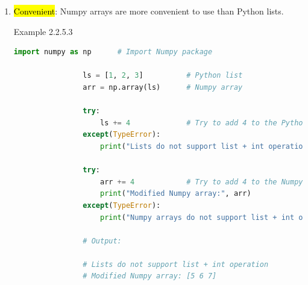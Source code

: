 \documentclass{book}
\begin{document}
\begin{enumerate}
\begin{egBox}{Example 2.2.5.2}{}
\begin{lstlisting}[language=Python, basicstyle=\ttfamily\small, keywordstyle=\color{blue}, commentstyle=\color{forestgreen}, stringstyle=\color{red}, showstringspaces=false]
size = 1000000  # Size of the arrays and lists

list1 = range(size) # Declare lists
list2 = range(size)
array1 = np.arange(size) # Declare Numpy arrays
array2 = np.arange(size)

# Capture time before the multiplication of Python lists
initial_time = T.time()
# Multiply elements of both the lists and stored in another list
result_list = [(a * b) for a, b in zip(list1, list2)]
# Calculate execution time, it prints "Time taken by Lists: 0.13024258613586426 s"
print("Time taken by Lists:", T.time() - initial_time, "s")

# Capture time before the multiplication of Numpy arrays
initial_time = T.time()
# Multiply elements of both the Numpy arrays and stored in another Numpy array
result_array = array1 * array2
# Calculate execution time, it prints "Time taken by Numpy Arrays: 0.006006956100463867 s"
print("Time taken by Numpy Arrays:", T.time() - initial_time, "s")
    \end{lstlisting}
\end{egBox}
\newpage
\item \hl{Convenient}: Numpy arrays are more convenient to use than Python lists.
    \begin{egBox}{Example 2.2.5.3}{}
        \begin{lstlisting}[language=Python, basicstyle=\ttfamily\small, keywordstyle=\color{blue}, commentstyle=\color{forestgreen}, stringstyle=\color{red},
        showstringspaces=false]
                import numpy as np      # Import Numpy package

                ls = [1, 2, 3]          # Python list
                arr = np.array(ls)      # Numpy array

                try:
                    ls += 4             # Try to add 4 to the Python list
                except(TypeError):
                    print("Lists do not support list + int operation")

                try:
                    arr += 4            # Try to add 4 to the Numpy array
                    print("Modified Numpy array:", arr)
                except(TypeError):
                    print("Numpy arrays do not support list + int operation")

                # Output:

                # Lists do not support list + int operation
                # Modified Numpy array: [5 6 7]
        \end{lstlisting}
    \end{egBox}
\end{enumerate}
\end{document}
